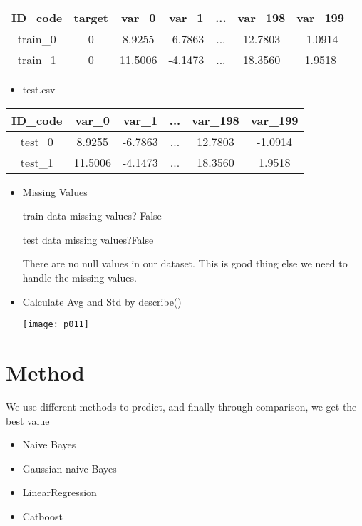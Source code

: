 \begin{tabular}{|c|c|c|c|c|c|c|}%

ID_code&target&var_0&var_1&...&var_198&var_199\\%
 \hline
train_0&0&8.9255 &-6.7863 &...  & 12.7803 & -1.0914  \\
 \hline
train_1&0&11.5006& -4.1473 &...  &18.3560  &   1.9518\\
\end{tabular}
\begin{itemize}
\item test.csv
\end{itemize}

\begin{tabular}{|c|c|c|c|c|c|}%

ID_code&var_0&var_1&...&var_198&var_199\\%
 \hline
test_0&8.9255 &-6.7863 &...  & 12.7803 & -1.0914  \\
 \hline
test_1&11.5006& -4.1473 &...  &18.3560  &   1.9518\\
\end{tabular}
\begin{itemize}
\item Missing Values
\par
train data missing values? False
\par
test data missing values?False
\par
There are no null values in our dataset. This is good thing else we need to handle the missing values.
\end{itemize}


\begin{itemize}
\item Calculate Avg and Std by describe()
\par
\texttt{[image: p011]}

\end{itemize}
\newpage
\section{Method}
We use different methods to predict, and finally through comparison, we get the best value
\begin{itemize}
\item Naive Bayes
\par

\item Gaussian naive Bayes
\par

\item LinearRegression
\par


\item Catboost
\par


\end{itemize}
